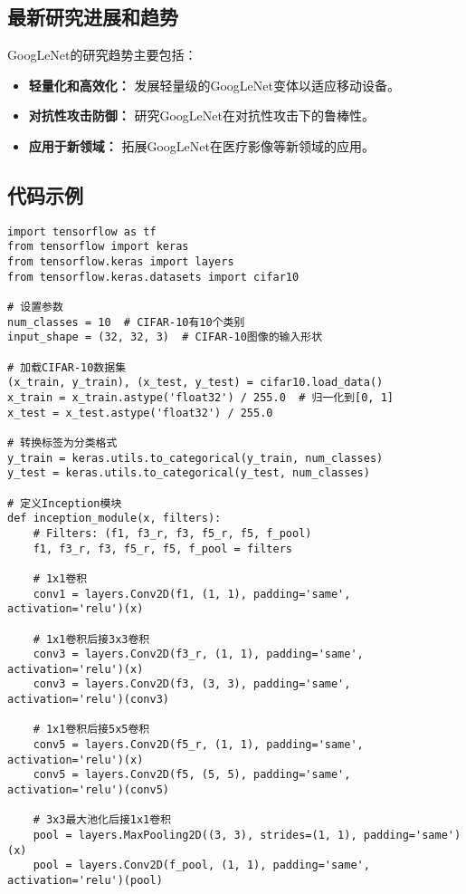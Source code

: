 \subsection*{最新研究进展和趋势}
GoogLeNet的研究趋势主要包括：
\begin{itemize}
    \item \textbf{轻量化和高效化：} 发展轻量级的GoogLeNet变体以适应移动设备。
    \item \textbf{对抗性攻击防御：} 研究GoogLeNet在对抗性攻击下的鲁棒性。
    \item \textbf{应用于新领域：} 拓展GoogLeNet在医疗影像等新领域的应用。
\end{itemize}
\subsection*{代码示例}
\begin{lstlisting}
import tensorflow as tf
from tensorflow import keras
from tensorflow.keras import layers
from tensorflow.keras.datasets import cifar10

# 设置参数
num_classes = 10  # CIFAR-10有10个类别
input_shape = (32, 32, 3)  # CIFAR-10图像的输入形状

# 加载CIFAR-10数据集
(x_train, y_train), (x_test, y_test) = cifar10.load_data()
x_train = x_train.astype('float32') / 255.0  # 归一化到[0, 1]
x_test = x_test.astype('float32') / 255.0

# 转换标签为分类格式
y_train = keras.utils.to_categorical(y_train, num_classes)
y_test = keras.utils.to_categorical(y_test, num_classes)

# 定义Inception模块
def inception_module(x, filters):
    # Filters: (f1, f3_r, f3, f5_r, f5, f_pool)
    f1, f3_r, f3, f5_r, f5, f_pool = filters

    # 1x1卷积
    conv1 = layers.Conv2D(f1, (1, 1), padding='same', activation='relu')(x)

    # 1x1卷积后接3x3卷积
    conv3 = layers.Conv2D(f3_r, (1, 1), padding='same', activation='relu')(x)
    conv3 = layers.Conv2D(f3, (3, 3), padding='same', activation='relu')(conv3)

    # 1x1卷积后接5x5卷积
    conv5 = layers.Conv2D(f5_r, (1, 1), padding='same', activation='relu')(x)
    conv5 = layers.Conv2D(f5, (5, 5), padding='same', activation='relu')(conv5)

    # 3x3最大池化后接1x1卷积
    pool = layers.MaxPooling2D((3, 3), strides=(1, 1), padding='same')(x)
    pool = layers.Conv2D(f_pool, (1, 1), padding='same', activation='relu')(pool)


\end{lstlisting}
